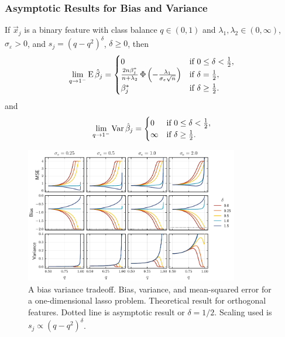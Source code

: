 \documentclass[aspectratio=1610,onlytextwidth]{beamer}
\begin{document}
\begin{frame}[c]
  \frametitle{Asymptotic Results for Bias and Variance}

  \begin{theorem}
    If \(\vec{x}_j\) is a binary feature with class balance \(q \in (0, 1)\) and \(\lambda_1,\lambda_2 \in (0,\infty)\), \(\sigma_\varepsilon > 0\), and \(s_j = (q - q^2)^{\delta}\), \(\delta \geq 0\), then
    \[
      \lim_{q \rightarrow 1^-} \operatorname{E} \hat{\beta}_j =
      \begin{cases}
        0                                                                                                  & \text{if } 0 \leq \delta < \frac{1}{2}, \\
        \frac{2n \beta_j^*}{n + \lambda_2} \operatorname{\Phi}\left(-\frac{\lambda_1}{\sigma_\varepsilon \sqrt{n}}\right) & \text{if } \delta = \frac{1}{2},        \\
        \beta^*_j                                                                                          & \text{if } \delta \geq \frac{1}{2}.
      \end{cases}
    \]
    \pause and
    \[
      \lim_{q \rightarrow 1^-} \operatorname{Var} \hat{\beta}_j =
      \begin{cases}
        0      & \text{if } 0 \leq \delta < \frac{1}{2}, \\
        \infty & \text{if } \delta \geq \frac{1}{2}.
      \end{cases}
    \]
  \end{theorem}

\end{frame}

\begin{frame}[c]

  \begin{figure}
    \centering
    \includegraphics[width=0.83\textwidth]{figures/bias-var-onedim.pdf}
    \caption{%
      A bias variance tradeoff. Bias, variance, and mean-squared error for a one-dimensional lasso problem. Theoretical result for orthogonal features. Dotted line is asymptotic result or \(\delta = 1/2\).
      Scaling used is \(s_j \propto (q - q^2)^\delta\).
    }
  \end{figure}

\end{frame}
\end{document}
